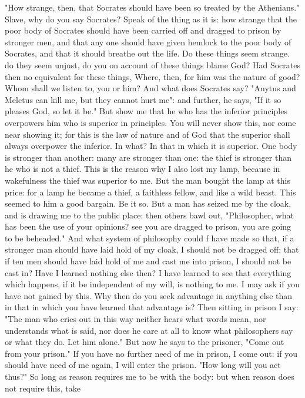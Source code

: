 \documentclass[a4paper]{article}
\begin{document}
    "How strange, then, that Socrates should have been so treated by the
Athenians." Slave, why do you say Socrates? Speak of the thing as it is: how
strange that the poor body of Socrates should have been carried off and dragged
to prison by stronger men, and that any one should have given hemlock to the
poor body of Socrates, and that it should breathe out the life. Do these things
seem strange. do they seem unjust, do you on account of these things blame God?
Had Socrates then no equivalent for these things, Where, then, for him was the
nature of good? Whom shall we listen to, you or him? And what does Socrates
say? "Anytus and Meletus can kill me, but they cannot hurt me": and further, he
says, "If it so pleases God, so let it be."
    But show me that he who has the inferior principles overpowers him who is
superior in principles. You will never show this, nor come near showing it; for
this is the law of nature and of God that the superior shall always overpower
the inferior. In what? In that in which it is superior. One body is stronger
than another: many are stronger than one: the thief is stronger than he who is
not a thief. This is the reason why I also lost my lamp, because in wakefulness
the thief was superior to me. But the man bought the lamp at this price: for a
lamp he became a thief, a faithless fellow, and like a wild beast. This seemed
to him a good bargain. Be it so. But a man has seized me by the cloak, and is
drawing me to the public place: then others bawl out, "Philosopher, what has
been the use of your opinions? see you are dragged to prison, you are going to
be beheaded." And what system of philosophy could f have made so that, if a
stronger man should have laid hold of my cloak, I should not be dragged off;
that if ten men should have laid hold of me and cast me into prison, I should
not be cast in? Have I learned nothing else then? I have learned to see that
everything which happens, if it be independent of my will, is nothing to me. I
may ask if you have not gained by this. Why then do you seek advantage in
anything else than in that in which you have learned that advantage is?
    Then sitting in prison I say: "The man who cries out in this way neither
hears what words mean, nor understands what is said, nor does he care at all to
know what philosophers say or what they do. Let him alone."
    But now he says to the prisoner, "Come out from your prison." If you have
no further need of me in prison, I come out: if you should have need of me
again, I will enter the prison. "How long will you act thus?" So long as reason
requires me to be with the body: but when reason does not require this, take
\end{document}
